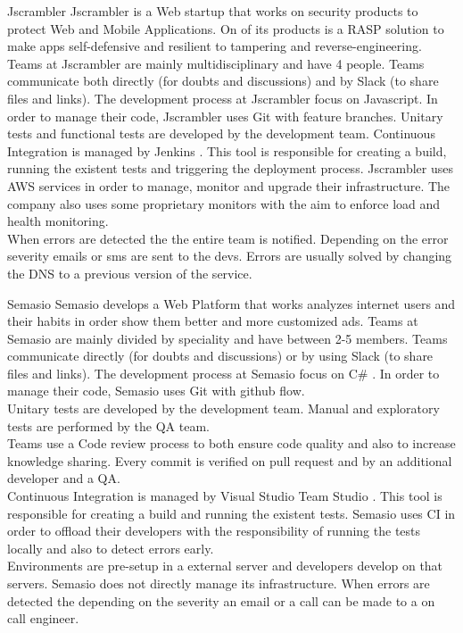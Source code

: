     \begin{companyreport}{Jscrambler}
      \product
      Jscrambler is a Web startup that works on security products to protect Web and Mobile Applications. On of its products is a RASP solution to make apps self-defensive and resilient to tampering and reverse-engineering.
      \teams
      Teams at Jscrambler are mainly multidisciplinary and have 4  people. Teams communicate both directly (for doubts and discussions) and by Slack (to share files and links).
      \development
      The development process at Jscrambler focus on Javascript. In order to manage their code, Jscrambler uses Git with feature branches.
      Unitary tests and functional tests are developed by the development team.
      Continuous Integration is managed by Jenkins . This tool is responsible for creating a build, running the existent tests and triggering the deployment process.
      \operations
      Jscrambler uses AWS services in order to manage, monitor and upgrade their infrastructure. The company also uses some proprietary monitors with the aim to enforce load and health monitoring. \\
      When errors are detected the the entire team is notified. Depending on the error severity emails or sms are sent to the devs. Errors are usually solved by changing the DNS to a previous version of the service.
      \reportend
    \end{companyreport}

    \begin{companyreport}{Semasio}
      \product
      Semasio develops a Web Platform that works analyzes internet users and their habits in order show them better and more customized ads.
      \teams
      Teams at Semasio are mainly divided by speciality and have between 2-5 members. Teams communicate directly (for doubts and discussions) or by using Slack (to share files and links).
      \development
      The development process at Semasio focus on C\# . In order to manage their code, Semasio uses Git with github flow.  \\
      Unitary tests are developed by the development team. Manual and exploratory tests are performed by the QA team.  \\
      Teams use a Code review process to both ensure code quality and also to increase knowledge sharing. Every commit is verified on pull request and by an additional developer and a QA. \\
      Continuous Integration is managed by Visual Studio Team Studio . This tool is  responsible for creating a build and running the existent tests. Semasio uses CI in order to offload their developers with the responsibility of running the tests locally and also to detect errors early. \\
      Environments are pre-setup in a external server and developers develop on that servers.
      \operations
      Semasio does not directly manage its infrastructure.
      When errors are detected the depending on the severity an email or a call can be made to a on call engineer.
      \reportend
    \end{companyreport}

